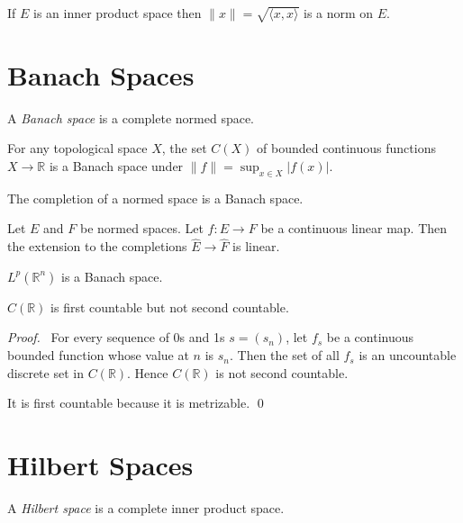 \begin{prop}
If $E$ is an inner product space then $\| x \| = \sqrt{\langle x,x \rangle}$ is a norm on $E$.
\end{prop}

\section{Banach Spaces}

\begin{df}
A \emph{Banach space} is a complete normed space.
\end{df}

\begin{ex}
For any topological space $X$, the set $C(X)$ of bounded continuous functions $X \rightarrow \mathbb{R}$ is a Banach space under $\| f \| = \sup_{x \in X} |f(x)|$.
\end{ex}

\begin{prop}
The completion of a normed space is a Banach space.
\end{prop}

\begin{prop}
Let $E$ and $F$ be normed spaces. Let $f : E \rightarrow F$ be a continuous linear map. Then the extension to the completions $\hat{E} \rightarrow \hat{F}$ is linear.
\end{prop}

\begin{prop}
$L^p(\mathbb{R}^n)$ is a Banach space.
\end{prop}

\begin{prop}
$C(\mathbb{R})$ is first countable but not second countable.
\end{prop}

\begin{proof}
\pf\ For every sequence of 0s and 1s $s = (s_n)$, let $f_s$ be a continuous bounded function whose value at $n$ is $s_n$. Then the set of all $f_s$ is an uncountable discrete set in $C(\mathbb{R})$. Hence $C(\mathbb{R})$ is not second countable.

It is first countable because it is metrizable. \qed
\end{proof}

\section{Hilbert Spaces}

\begin{df}
A \emph{Hilbert space} is a complete inner product space.
\end{df}

